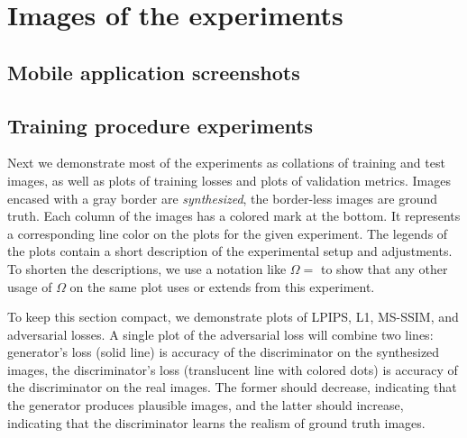 \chapter{Images of the experiments}

\section{Mobile application screenshots}

\clearpage
\newpage

\section{Training procedure experiments}
Next we demonstrate most of the experiments as collations of training and test images, as well as plots of training losses and plots of validation metrics. Images encased with a gray border are \textit{synthesized}, the border-less images are ground truth. Each column of the images has a colored mark at the bottom. It represents a corresponding line color on the plots for the given experiment. The legends of the plots contain a short description of the experimental setup and adjustments. To shorten the descriptions, we use a notation like $\Omega=$ to show that any other usage of $\Omega$ on the same plot uses or extends from this experiment. 

To keep this section compact, we demonstrate plots of LPIPS, L1, MS-SSIM, and adversarial losses. A single plot of the adversarial loss will combine two lines: generator's loss (solid line) is accuracy of the discriminator on the synthesized images, the discriminator's loss (translucent line with colored dots) is accuracy of the discriminator on the real images. The former should decrease, indicating that the generator produces plausible images, and the latter should increase, indicating that the discriminator learns the realism of ground truth images.

